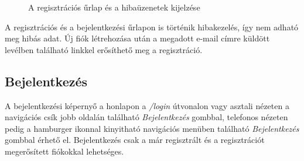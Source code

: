 \begin{figure}[h]
  \caption{A regisztrációs űrlap és a hibaüzenetek kijelzése}
\end{figure}

A regisztrációs és a bejelentkezési űrlapon is történik hibakezelés, így nem adható meg hibás adat. Új fiók létrehozása után a megadott e-mail címre küldött levélben található linkkel erősíthető meg a regisztráció.

\subsection{Bejelentkezés}
A bejelentkezési képernyő a honlapon a \emph{/login} útvonalon vagy asztali nézeten a navigációs csík jobb oldalán található \emph{Bejelentkezés} gombbal, telefonos nézeten pedig a hamburger ikonnal kinyitható navigációs menüben található \emph{Bejelentkezés} gombbal érhető el. Bejelentkezés csak a már regisztrált és a regisztrációt megerősített fiókokkal lehetséges.

